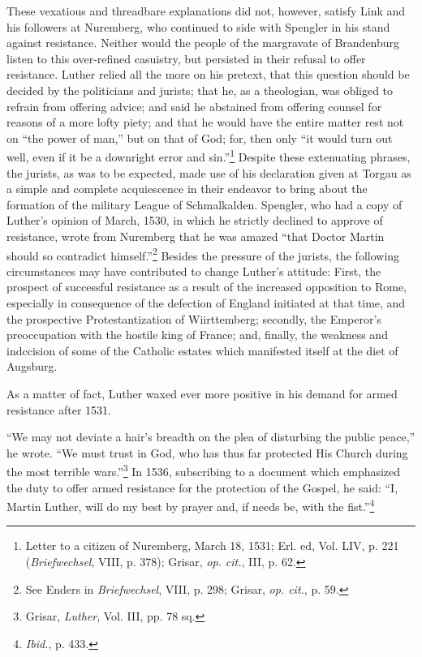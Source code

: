 These vexatious and threadbare explanations did not, however,
satisfy Link and his followers at Nuremberg, who continued to
side with Spengler in his stand against resistance. Neither would the
people of the margravate of Brandenburg listen to this over-refined
casuistry, but persisted in their refusal to offer resistance. Luther
relied all the more on his pretext, that this question should be decided
by the politicians and jurists; that he, as a theologian, was
obliged to refrain from offering advice; and said he abstained from
offering counsel for reasons of a more lofty piety; and that he would
have the entire matter rest not on “the power of man,” but on that
of God; for, then only “it would turn out well, even if it be a
downright error and sin.”\footnote
{Letter to a citizen of Nuremberg, March 18, 1531; Erl. ed, Vol. LIV, p. 221
(\textit{Briefwechsel}, VIII, p. 378); Grisar, \textit{op. cit.}, III, p. 62.}
Despite these extenuating phrases, the
jurists, as was to be expected, made use of his declaration given at
Torgau as a simple and complete acquiescence in their endeavor to
bring about the formation of the military League of Schmalkalden.
Spengler, who had a copy of Luther’s opinion of March, 1530, in
which he strictly declined to approve of resistance, wrote from
Nuremberg that he was amazed “that Doctor Martin should so
contradict himself.”\footnote
{See Enders in \textit{Briefwechsel}, VIII, p. 298; Grisar, \textit{op. cit.}, p. 59.}
 Besides the pressure of the jurists, the following
circumstances may have contributed to change Luther’s attitude: First,
the prospect of successful resistance as a result of the
increased opposition to Rome, especially in consequence of the defection
of England initiated at that time, and the prospective
Protestantization of Wiirttemberg; secondly, the Emperor’s preoccupation
with the hostile king of France; and, finally, the weakness and
indccision of some of the Catholic estates which manifested itself at
the diet of Augsburg.

As a matter of fact, Luther waxed ever more positive in his demand
for armed resistance after 1531.

“We may not deviate a hair’s breadth on the plea of disturbing the
public peace,” he wrote. “We must trust in God, who has thus far
protected His Church during the most terrible wars.”\footnote
{Grisar, \textit{Luther}, Vol. III, pp. 78 sq.}
In 1536,
subscribing to a document which emphasized the duty to offer
armed resistance for the protection of the Gospel, he said: “I, Martin
Luther, will do my best by prayer and, if needs be, with the fist.”\footnote{\textit{Ibid.}, p. 433.}

